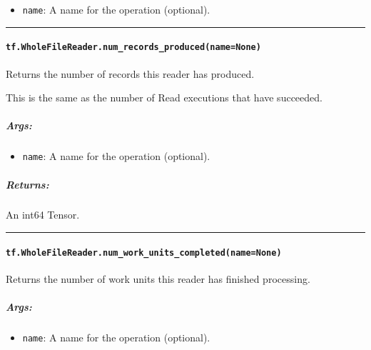 \begin{itemize}
\tightlist
\item
  \texttt{name}: A name for the operation (optional).
\end{itemize}

\begin{center}\rule{0.5\linewidth}{\linethickness}\end{center}

\paragraph{\texorpdfstring{\texttt{tf.WholeFileReader.num\_records\_produced(name=None)}
}{tf.WholeFileReader.num\_records\_produced(name=None) }}\label{tf.wholefilereader.numux5frecordsux5fproducednamenone}

Returns the number of records this reader has produced.

This is the same as the number of Read executions that have succeeded.

\subparagraph{Args: }\label{args-16}

\begin{itemize}
\tightlist
\item
  \texttt{name}: A name for the operation (optional).
\end{itemize}

\subparagraph{Returns: }\label{returns-13}

An int64 Tensor.

\begin{center}\rule{0.5\linewidth}{\linethickness}\end{center}

\paragraph{\texorpdfstring{\texttt{tf.WholeFileReader.num\_work\_units\_completed(name=None)}
}{tf.WholeFileReader.num\_work\_units\_completed(name=None) }}\label{tf.wholefilereader.numux5fworkux5funitsux5fcompletednamenone}

Returns the number of work units this reader has finished processing.

\subparagraph{Args: }\label{args-17}

\begin{itemize}
\tightlist
\item
  \texttt{name}: A name for the operation (optional).
\end{itemize}

